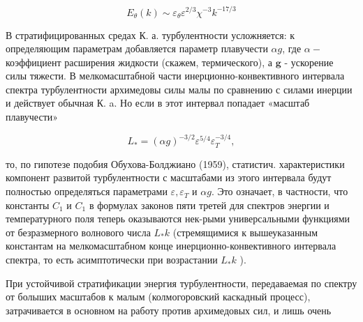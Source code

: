 \documentclass[10pt]{article}
\begin{document}
\[

E_{\theta}(k) \sim \varepsilon_{\theta} \varepsilon^{2 / 3} \chi^{-3} k^{-17 / 3}

\]



В стратифицированных средах К. а. турбулентности усложняется: к определяющим параметрам добавляется параметр плавучести $\alpha g$, где $\alpha-$ коэффициент расширения жидкости (скажем, термического), а $\boldsymbol{g}$ - ускорение силы тяжести. В мелкомасштабной части инерционно-конвективного интервала спектра турбулентности архимедовы силы малы по сравнению с силами инерции и действует обычная К. a. Но если в этот интервал попадает «масштаб плавучести»



\[

L_{*}=(\alpha g)^{-3 / 2} \varepsilon^{5 / 4} \varepsilon_{T}^{-3 / 4},

\]



то, по гипотезе подобия Обухова-Болджиано (1959), статистич. характеристики компонент развитой турбулентности с масштабами из этого интервала будут полностью определяться параметрами $\varepsilon, \varepsilon_{T}$ и $\alpha g$. Это означает, в частности, что константы $C_{1}$ и $C_{1}$ в формулах законов пяти третей для спектров энергии и температурного поля теперь оказываются нек-рыми универсальными функциями от безразмерного волнового числа $L_{*} k$ (стремящимися к вышеуказанным константам на мелкомасштабном конце инерционно-конвективного интервала спектра, то есть асимптотически при возрастании $L_{*} k$ ).



При устойчивой стратификации энергия турбулентности, передаваемая по спектру от болыших масштабов к малым (колмогоровский каскадный процесс), затрачивается в основном на работу против архимедовых сил, и лишь очень
\end{document}
